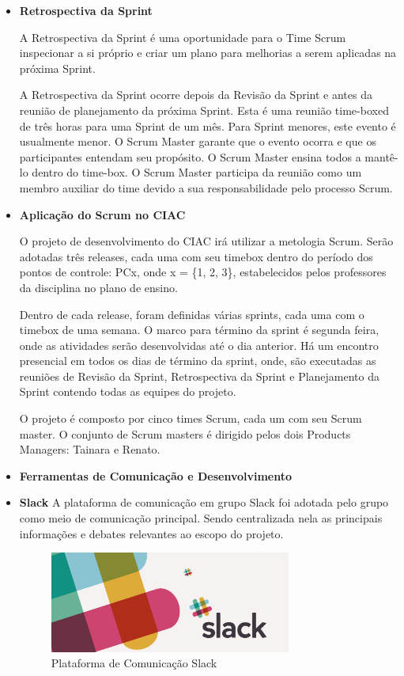 \begin{itemize}
\item \textbf{Retrospectiva da Sprint}
\label{subs:Retrospectiva da Sprint}

A Retrospectiva da Sprint é uma oportunidade para o Time Scrum inspecionar a si próprio e
criar um plano para melhorias a serem aplicadas na próxima Sprint.

A Retrospectiva da Sprint ocorre depois da Revisão da Sprint e antes da reunião de
planejamento da próxima Sprint. Esta é uma reunião time-boxed de três horas para uma Sprint
de um mês. Para Sprint menores, este evento é usualmente menor. O Scrum Master garante
que o evento ocorra e que os participantes entendam seu propósito. O Scrum Master ensina
todos a mantê-lo dentro do time-box. O Scrum Master participa da reunião como um membro
auxiliar do time devido a sua responsabilidade pelo processo Scrum.

\item \textbf{Aplicação do Scrum no CIAC}

O projeto de desenvolvimento do CIAC irá utilizar a metologia Scrum.
Serão adotadas três releases, cada uma com seu timebox dentro do período dos pontos
de controle: PCx, onde x = \{1, 2, 3\}, estabelecidos pelos professores da disciplina no plano de ensino.

Dentro de cada release, foram definidas várias sprints, cada uma com o timebox
de uma semana. O marco para término da sprint é segunda feira, onde as atividades
serão desenvolvidas até o dia anterior. Há um encontro presencial em todos os dias
de término da sprint, onde, são executadas as reuniões de Revisão da Sprint,
Retrospectiva da Sprint e Planejamento da Sprint contendo todas as equipes
do projeto.

O projeto é composto por cinco times Scrum, cada um com seu Scrum master.
O conjunto de Scrum masters é dirigido pelos dois Products Managers: Tainara e Renato.

\item \textbf{Ferramentas de Comunicação e Desenvolvimento}
\item \textbf{Slack}
A plataforma de comunicação em grupo Slack foi adotada pelo grupo como meio de comunicação principal.
Sendo centralizada nela as principais informações e debates relevantes ao escopo do projeto.

\begin{figure}[h]
  \centering
  \includegraphics[width=300px, scale=0.5]{figuras/slack}
  \caption{Plataforma de Comunicação Slack}
  \label{table:slack}
\end{figure}



\end{itemize}
